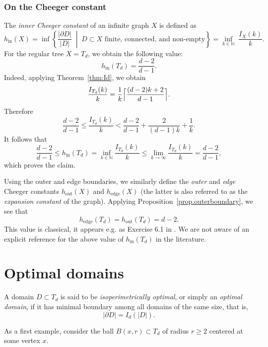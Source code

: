 \documentclass[a4paper, 11pt]{article}
\numberwithin{equation}{section}
\theoremstyle{definition}
\theoremstyle{remark}
\begin{document}
\subsubsection*{On the Cheeger constant}\label{subsec.cheeger}

The \emph{inner Cheeger constant} of an infinite graph $X$ is defined as
\[
 h_{\mathrm{in}}(X) = \inf\left\{    \frac{|\partial D|}{|D|}    \;\middle|\;    D\subset X \text{ finite, connected, and non-empty}
 \right\}
 = \inf_{k\in \mathbb{N}} \;  \frac{I_X(k)}{k}.
\]
For the regular tree  $X = T_d$,  we obtain the following value:
$$  
h_{\mathrm{in}}(T_d) = \frac{d-2}{d-1}.
$$
Indeed, applying Theorem~\ref{thm:Id}, we obtain  
$$
 \frac{I_{T_d}(k)}{k} = \frac{1}{k} \Bigl\lceil \frac{(d-2)k+2}{d-1}\Bigr\rceil.
$$
Therefore
$$
\frac{d-2}{d-1} \le \frac{I_{T_d}(k)}{k} < \frac{d-2}{d-1} + \frac{2}{(d-1)k} + \frac{1}{k}.
$$
It follows that
$$
 \frac{d-2}{d-1} \leq h_{\mathrm{in}}(T_d) = \inf_{k\in\mathbb N}\frac{I_{T_d}(k)}{k}
 \leq \lim_{k\to\infty}\frac{I_{T_d}(k)}{k} = \frac{d-2}{d-1},
$$
which proves the claim.

 
 \medskip 

Using the outer and edge  boundaries, we similarly define  the \textit{outer} and \textit{edge} Cheeger constants $h_{\mathrm{out}}(X)$ and $h_{\mathrm{edge}}(X)$ (the latter is also referred to as the \textit{expansion constant} of the graph).  Applying Proposition~\ref{prop.outerboundary}, we see that 
$$
   h_{\mathrm{edge}}(T_d)  = h_{\mathrm{out}}(T_d) = d-2.
$$
This value is  classical, it appears e.g. as Exercise 6.1 in \cite{LyonsPeres2016}.
We are not aware of an explicit reference for the above value of $h_{\mathrm{in}}(T_d)$ in the literature.
 

\section{Optimal domains}
\label{sec.optimaldomains}

A domain $D\subset T_d$ is said to be \emph{isoperimetrically optimal}, or simply an \emph{optimal domain},
if it has minimal boundary among all domains of the same size, that is,
\[
|\partial D| = I_d(|D|).
\]

As a first example, consider the ball $B(x,r)\subset T_d$ of radius $r\ge 2$ centered at some vertex $x$. 
\end{document}
